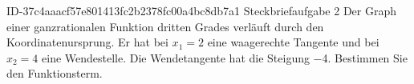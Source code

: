 \begin{exercise}
      {ID-37c4aaacf57e801413fc2b2378fc00a4bc8db7a1}
      {Steckbriefaufgabe 2}
  \ifproblem\problem
    Der Graph einer ganzrationalen Funktion dritten Grades verläuft durch
    den Koordinatenursprung. Er hat bei $x_1=\num{2}$ eine waagerechte
    Tangente und bei $x_2=\num{4}$ eine Wendestelle. Die Wendetangente hat
    die Steigung \num{-4}. Bestimmen Sie den Funktionsterm.
  \fi
\end{exercise}
